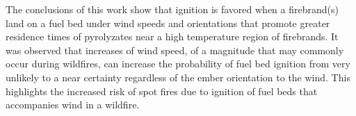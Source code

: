     The conclusions of this work show that ignition is favored when a firebrand(s) land on a fuel bed under wind speeds and orientations that promote greater residence times of pyrolyzates near a high temperature region of firebrands. It was observed that increases of wind speed, of a magnitude that may commonly occur during wildfires, can increase the probability of fuel bed ignition from very unlikely to a near certainty regardless of the ember orientation to the wind. This highlights the increased risk of spot fires due to ignition of fuel beds that accompanies wind in a wildfire. 